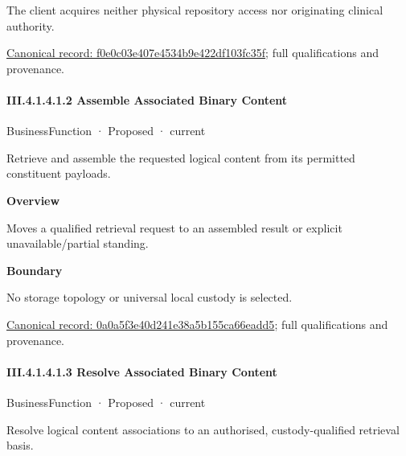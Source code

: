 The client acquires neither physical repository access nor originating clinical authority.


{\footnotesize \href{../../../../../../../../continuum/business/business-service/f0e0c03e407e4534b9e422df103fc35f.md}{Canonical record: f0e0c03e407e4534b9e422df103fc35f}; full qualifications and provenance.}\par
\paragraph*{III.4.1.4.1.2 Assemble Associated Binary Content}
\label{navigation:III.4.1.4.1.2}

\label{element:0a0a5f3e40d241e38a5b155ca66eadd5}
{\small BusinessFunction · Proposed · current}\par

Retrieve and assemble the requested logical content from its permitted constituent payloads.



\textbf{Overview}



Moves a qualified retrieval request to an assembled result or explicit unavailable/partial standing.



\textbf{Boundary}



No storage topology or universal local custody is selected.


{\footnotesize \href{../../../../../../../../continuum/business/business-function/0a0a5f3e40d241e38a5b155ca66eadd5.md}{Canonical record: 0a0a5f3e40d241e38a5b155ca66eadd5}; full qualifications and provenance.}\par
\paragraph*{III.4.1.4.1.3 Resolve Associated Binary Content}
\label{navigation:III.4.1.4.1.3}

\label{element:118867dc136f4f689265b173abdf626b}
{\small BusinessFunction · Proposed · current}\par

Resolve logical content associations to an authorised, custody-qualified retrieval basis.



